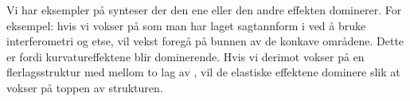 Vi har eksempler på synteser der den ene eller den andre effekten dominerer. For eksempel: hvis vi vokser  på  som man har laget sagtannform i ved å bruke interferometri og etse, vil vekst foregå på bunnen av de konkave områdene. Dette er fordi kurvatureffektene blir dominerende. Hvis vi derimot vokser  på en flerlagsstruktur med  mellom to lag av , vil de elastiske effektene dominere slik at  vokser på toppen av strukturen.

